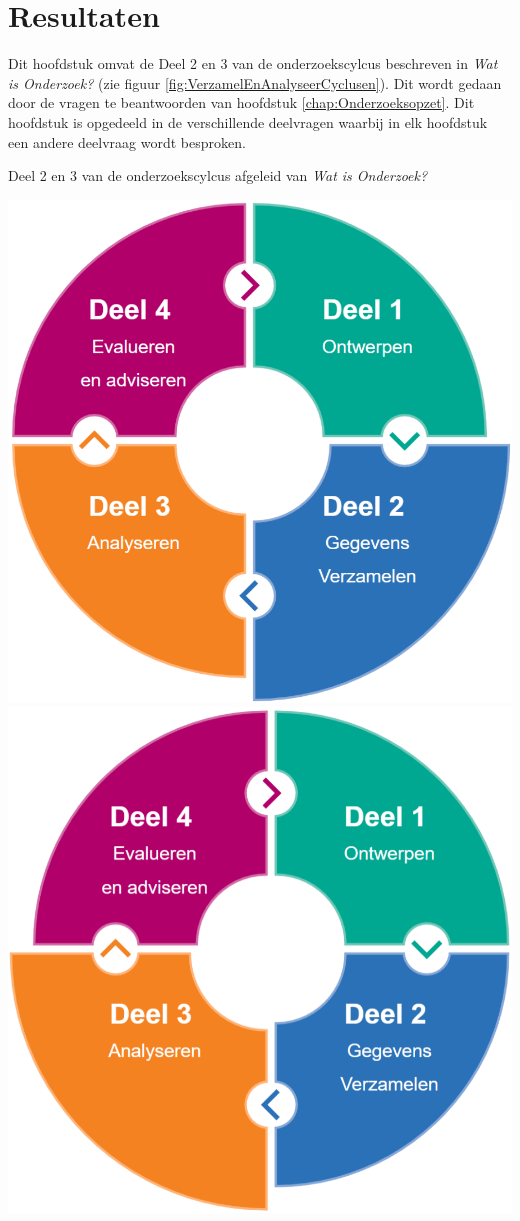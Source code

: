 \chapter{Resultaten}
Dit hoofdstuk omvat de Deel 2 en 3 van de onderzoekscylcus beschreven in \textit{Wat is Onderzoek?} (zie figuur \ref{fig:VerzamelEnAnalyseerCyclusen}).
Dit wordt gedaan door de vragen te beantwoorden van hoofdstuk \ref{chap:Onderzoeksopzet}.
Dit hoofdstuk is opgedeeld in de verschillende deelvragen waarbij in elk hoofdstuk een andere deelvraag wordt besproken.

\begin{graphic}
	\vspace{0.2cm}
	\captionsetup{type=figure}
    \caption{Deel 2 en 3 van de onderzoekscylcus afgeleid van \textit{Wat is Onderzoek?}}
    \includegraphics[scale=0.4]{img/GegevensVerzamelenCyclus.png}
	\includegraphics[scale=0.4]{img/AnalyserenCyclus.png}

\end{graphic}
